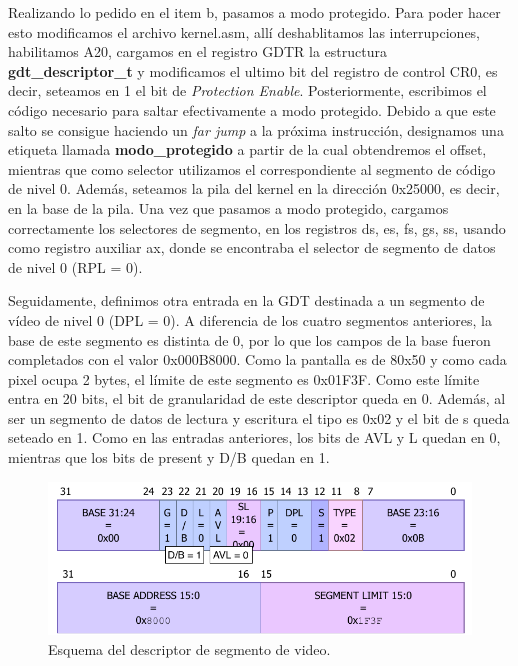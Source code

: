 \documentclass[a4paper]{article}
\begin{document}
\justify
Realizando lo pedido en el item b, pasamos a modo protegido. Para poder hacer esto modificamos el archivo kernel.asm, allí deshablitamos las interrupciones, habilitamos A20, cargamos en el registro GDTR la estructura \textbf{gdt_descriptor_t} y modificamos el ultimo bit del registro de control CR0, es decir, seteamos en 1 el bit de \textit{Protection Enable}. Posteriormente, escribimos el código necesario para saltar efectivamente a modo protegido. Debido a que este salto se consigue haciendo un \textit{far jump} a la próxima instrucción, designamos una etiqueta llamada \textbf{modo_protegido} a partir de la cual obtendremos el offset, mientras que como selector utilizamos el correspondiente al segmento de código de nivel 0. Además, seteamos la pila del kernel en la dirección 0x25000, es decir, en la base de la pila. Una vez que pasamos a modo protegido, cargamos correctamente los selectores de segmento, en los registros ds, es, fs, gs, ss, usando como registro auxiliar ax, donde se encontraba el selector de segmento de datos de nivel 0 (RPL = 0).


\justify
Seguidamente, definimos otra entrada en la GDT destinada a un segmento de vídeo de nivel 0 (DPL = 0). A diferencia de los cuatro segmentos anteriores, la base de este segmento es distinta de 0, por lo que los campos de la base fueron completados con el valor 0x000B8000. Como la pantalla es de 80x50 y como cada pixel ocupa 2 bytes, el límite de este segmento es 0x01F3F. Como este límite entra en 20 bits, el bit de granularidad de este descriptor queda en 0. Además, al ser un segmento de datos de lectura y escritura el tipo es 0x02 y el bit de s queda seteado en 1. Como en las entradas anteriores, los bits de AVL y L quedan en 0, mientras que los bits de present y D/B quedan en 1.  

\begin{figure}[h]
	\centering
	\includegraphics[scale=0.8]{img/DescriptorVideo.pdf}
	\caption{Esquema del descriptor de segmento de video.}
\end{figure}
\end{document}
